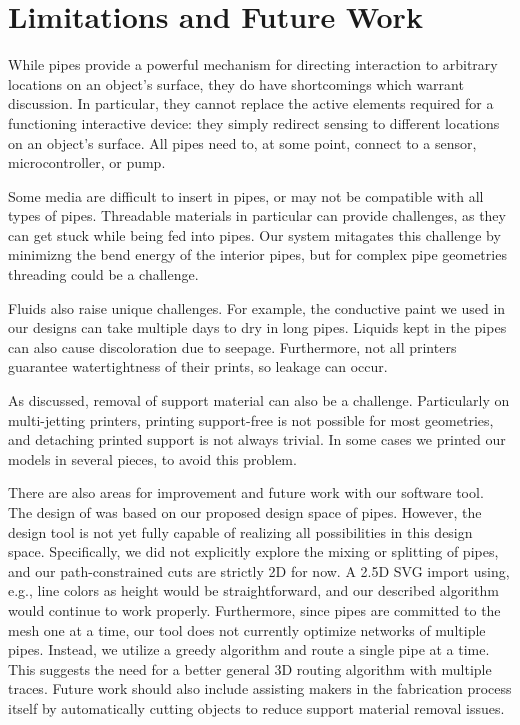 \section{Limitations and Future Work}
While pipes provide a powerful mechanism for directing interaction to arbitrary locations on an object's surface, they do have shortcomings which warrant discussion.  In particular, they cannot replace the active elements required for a functioning interactive device: they simply redirect sensing to different locations on an object's surface.  All pipes need to, at some point, connect to a sensor, microcontroller, or pump. 

Some media are difficult to insert in pipes, or may not be compatible with all types of pipes.  Threadable materials in particular can provide challenges, as they can get stuck while being fed into pipes. Our system mitagates this challenge by minimizng the bend energy of the interior pipes, but for complex pipe geometries threading could be a challenge. 

Fluids also raise unique challenges.  For example, the conductive paint we used in our designs can take multiple days to dry in long pipes. Liquids kept in the pipes can also cause discoloration due to seepage.  Furthermore, not all printers guarantee watertightness of their prints, so leakage can occur.

As discussed, removal of support material can also be a challenge.  Particularly on multi-jetting printers, printing support-free is not possible for most geometries, and detaching printed support is not always trivial. In some cases we printed our models in several pieces, to avoid this problem. 

There are also areas for improvement and future work with our software tool.  The design of \systemname was based on our proposed design space of pipes.  However, the design tool is not yet fully capable of realizing all possibilities in this design space.  Specifically, we did not explicitly explore the mixing or splitting of pipes, and our path-constrained cuts are strictly 2D for now.  A 2.5D SVG import using, e.g., line colors as height would be straightforward, and our described algorithm would continue to work properly.  Furthermore, since pipes are committed to the mesh one at a time, our tool does not currently optimize networks of multiple pipes. Instead, we utilize a greedy algorithm and route a single pipe at a time.  This suggests the need for a better general 3D routing algorithm with multiple traces.  Future work should also include assisting makers in the fabrication process itself by automatically cutting objects to reduce support material removal issues. %

